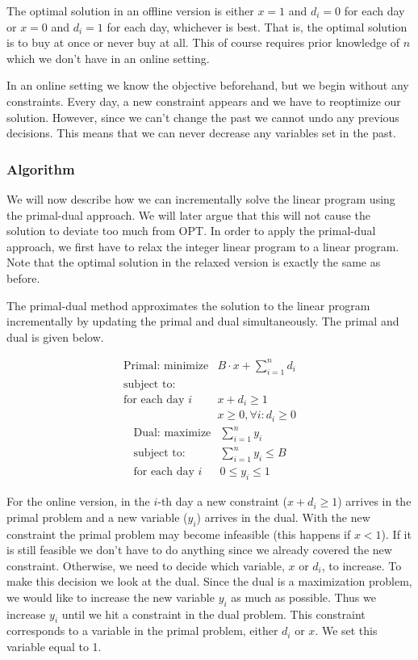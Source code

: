 The optimal solution in an offline version is either $x=1$ and $d_i = 0$ for each day or $x=0$ and $d_i = 1$ for each day, whichever is best.
That is, the optimal solution is to buy at once or never buy at all.
This of course requires prior knowledge of $n$ which we don't have in an online setting.

In an online setting we know the objective beforehand, but we begin without any constraints.
Every day, a new constraint appears and we have to reoptimize our solution.
However, since we can't change the past we cannot undo any previous decisions.
This means that we can never decrease any variables set in the past.

\subsubsection{Algorithm}

We will now describe how we can incrementally solve the linear program using the primal-dual approach.
We will later argue that this will not cause the solution to deviate too much from OPT.
In order to apply the primal-dual approach, we first have to relax the integer linear program to a linear program. Note that the optimal solution in the relaxed version is exactly the same as before.

The primal-dual method approximates the solution to the linear program incrementally by updating the primal and dual simultaneously.
The primal and dual is given below.

\[
	\begin{array}{lr}
	\textrm{Primal: minimize}   & B\cdot x + \sum^n_{i=1} d_i   \\
	\textrm{subject to:} & \\
	\textrm{for each day $i$} & x + d_i  \ge 1  \\
			    & x     \geq 0, \forall i : d_i \ge 0
	\end{array}
\]
\[
	\begin{array}{lr}
	\textrm{Dual: maximize}   & \sum^n_{i=1} y_i   \\
	\textrm{subject to:} & \sum^n_{i=1} y_i \le B \\
	\textrm{for each day $i$} & 0 \le y_i  \le 1
	\end{array}
\]

For the online version, in the $i$-th day a new constraint ($x + d_i  \ge 1$) arrives in the primal problem and a new variable ($y_i$) arrives in the dual. 
With the new constraint the primal problem may become infeasible (this happens if $x < 1$). 
If it is still feasible we don't have to do anything since we already covered the new constraint. 
Otherwise, we need to decide which variable, $x$ or $d_i$, to increase. 
To make this decision we look at the dual. 
Since the dual is a maximization problem, we would like to increase the new variable $y_i$ as much as possible.
Thus we increase $y_i$ until we hit a constraint in the dual problem.
This constraint corresponds to a variable in the primal problem, either $d_i$ or $x$.
We set this variable equal to 1.

